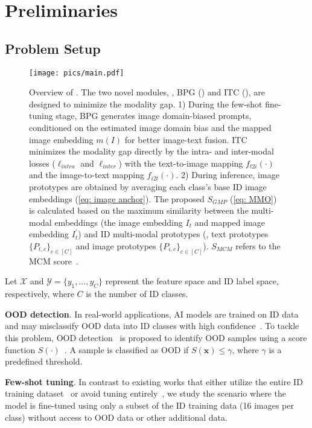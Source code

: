 \section{Preliminaries}

\subsection{Problem Setup}

\begin{figure*}
    \centering
    \texttt{[image: pics/main.pdf]}
    \vspace{-2.3em}
    \caption{
    Overview of \ours. 
    The two novel modules, \ie, BPG (\BPG) and ITC (\ITC), are designed to minimize the modality gap. 
    1) During the few-shot fine-tuning stage, BPG generates image domain-biased prompts, conditioned on the estimated image domain bias and the mapped image embedding $m(I)$ for better image-text fusion.
    ITC minimizes the modality gap directly by the intra- and inter-modal losses ($\ell_{\textit{intra}}$ and $\ell_{\textit{inter}}$) with the text-to-image mapping $f_{t2i}(\cdot)$ and the image-to-text mapping $f_{i2t}(\cdot)$. 
    2) During inference, image prototypes are obtained by averaging each class's base ID image embeddings (\cref{eq: image anchor}). 
    The proposed $S_{\textit{GMP}}$ (\cref{eq: MMO}) is calculated based on the maximum similarity between the multi-modal embeddings (the image embedding $I_t$ and mapped image embedding $I_t^{'}$) and ID multi-modal prototypes (\ie, text prototypes $\{P_{t,c}\}_{c\in[C]}$ and image prototypes $\{P_{i,c}\}_{c\in[C]}$). 
    $S_{\textit{MCM}}$ refers to the MCM score~\cite{ming2022delving}.
    }
    \label{fig: main figure}
\end{figure*}

Let $\mathcal{X}$ and $\mathcal{Y}=\{y_{1}, \ldots, y_{C}\}$ represent the feature space and ID label space, respectively, where $C$ is the number of ID classes. 

\noindent \textbf{OOD detection}. 
In real-world applications, AI models are trained on ID data and may misclassify OOD data into ID classes with high confidence~\cite{joseph_towards_2021}. 
To tackle this problem, OOD detection~\cite{yang_generalized_2024} is proposed to identify OOD samples using a score function $S(\cdot)$~\cite{li_rethinking_2023,li_moodv2_2024}. 
A sample is classified as OOD if $S(\mathbf{x}) \leq \gamma$, where $\gamma$ is a predefined threshold. 

\noindent \textbf{Few-shot tuning}. 
In contrast to existing works that either utilize the entire ID training dataset~\cite{li_tagood_2024,Wang_2022_CVPR,lee_simple_2018} or avoid tuning entirely~\cite{wang_clipn_2023,ming2022delving,cao_envisioning_2024,jiang2024negative}, we study the scenario where the model is fine-tuned using only a subset of the ID training data (16 images per class) {without} access to OOD data or other additional data. 

